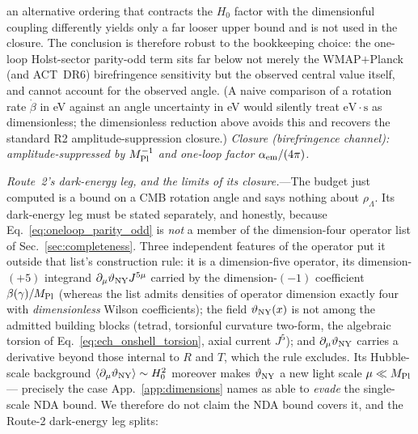 \documentclass[aps,prd,twocolumn,superscriptaddress,showpacs,preprintnumbers,nofootinbib,longbibliography,floatfix]{revtex4-2}
\newcommand{\MPl}{M_{\rm Pl}}
\begin{document}
an alternative ordering that contracts the $H_0$ factor with the
dimensionful coupling differently yields only a far looser upper
bound and is not used in the closure. The conclusion is therefore robust
to the bookkeeping choice: the one-loop Holst-sector parity-odd term sits
far below not merely the WMAP$+$Planck (and ACT~DR6) birefringence
sensitivity but the observed central value itself, and cannot account for
the observed angle. (A naive comparison of a rotation rate $\dot\beta$ in eV against an angle
uncertainty in eV would silently treat $\mathrm{eV}\cdot\mathrm{s}$ as
dimensionless; the dimensionless reduction above avoids this and recovers
the standard R2 amplitude-suppression closure.)
\emph{Closure (birefringence channel): amplitude-suppressed by
$M_{\rm Pl}^{-1}$ and one-loop factor $\alpha_{\rm em}/(4\pi)$.}

\emph{Route~2's dark-energy leg, and the limits of its closure.}---The
budget just computed is a bound on a CMB rotation angle and says nothing
about $\rho_\Lambda$. Its dark-energy leg must be stated separately, and
honestly, because Eq.~\eqref{eq:oneloop_parity_odd} is \emph{not} a member
of the dimension-four operator list of Sec.~\ref{sec:completeness}. Three
independent features of the operator put it outside that list's
construction rule: it is a dimension-five operator, its
dimension-$(+5)$ integrand
$\partial_\mu\vartheta_{\rm NY}J^{5\mu}$ carried by the
dimension-$(-1)$ coefficient $\beta(\gamma)/M_{\rm Pl}$ (whereas the list
admits densities of operator dimension exactly four with
\emph{dimensionless} Wilson coefficients); the field
$\vartheta_{\rm NY}(x)$ is not among the admitted building blocks
(tetrad, torsionful curvature two-form, the algebraic torsion of
Eq.~\eqref{eq:ech_onshell_torsion},
axial current $J^5$); and $\partial_\mu\vartheta_{\rm NY}$ carries a
derivative beyond those internal to $R$ and $T$, which the rule excludes.
Its Hubble-scale background
$\langle\partial_\mu\vartheta_{\rm NY}\rangle\sim H_0^2$ moreover makes
$\vartheta_{\rm NY}$ a new light scale $\mu\ll\MPl$ --- precisely the case
App.~\ref{app:dimensions} names as able to \emph{evade} the single-scale
NDA bound. We therefore do not claim the NDA bound covers it, and the
Route-2 dark-energy leg splits:
\end{document}
